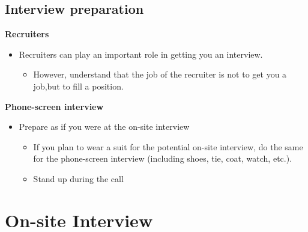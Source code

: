 \documentclass{beamer}
\begin{document}
\subsection{Interview preparation}
	
\begin{frame}
	\center
	\textbf{Recruiters}\\
	\pause
	\begin{itemize}
		\item  Recruiters can play an important role in getting you an interview.
		\pause
		\begin{itemize}
			\item However, understand that the job of the recruiter is not to get
			you a job,\pause \alert {but to fill a position.}
		\end{itemize}
	\end{itemize}
\end{frame}

\begin{frame}
	\center
	\textbf{Phone-screen interview}\\
	\pause
	\begin{itemize}
		\item Prepare as if you were at the on-site interview
		\pause
			\begin{itemize}
				\item If you plan to wear a suit for the potential on-site interview, do the same for the phone-screen interview (including shoes, tie, coat, watch, etc.).
				\pause
				\item Stand up during the call
			\end{itemize}
	\end{itemize}
\end{frame}
\section{On-site Interview}
\end{document}
